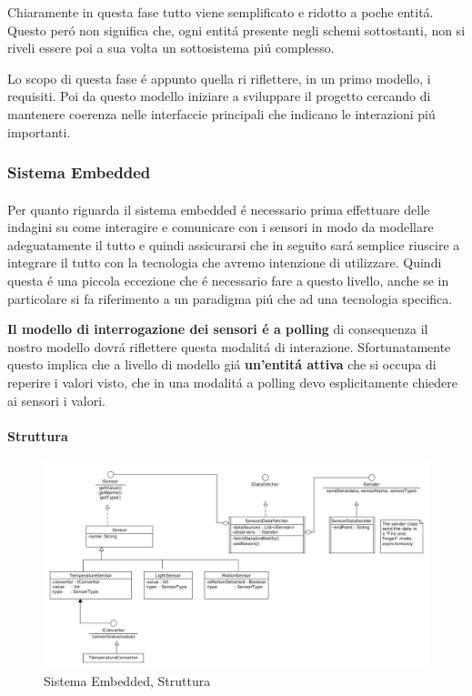Chiaramente in questa fase tutto viene semplificato e ridotto a poche entit\'a. Questo per\'o non significa che, ogni entit\'a presente negli schemi sottostanti, non si riveli essere poi a sua volta un sottosistema pi\'u complesso.

Lo scopo di questa fase \'e appunto quella ri riflettere, in un primo modello, i requisiti. Poi da questo modello iniziare a sviluppare il progetto cercando di mantenere coerenza nelle interfaccie principali che indicano le interazioni pi\'u importanti.

\subsubsection{Sistema Embedded}

\paragraph{}Per quanto riguarda il sistema embedded \'e necessario prima effettuare delle indagini su come interagire e comunicare con i sensori in modo da modellare adeguatamente il tutto e quindi assicurarsi che in seguito sar\'a semplice riuscire a integrare il tutto con la tecnologia che avremo intenzione di utilizzare. Quindi questa \'e una piccola eccezione che \'e necessario fare a questo livello, anche se in particolare si fa riferimento a un paradigma pi\'u che ad una tecnologia specifica.

\textbf{Il modello di interrogazione dei sensori \'e a polling} di consequenza il nostro modello dovr\'a riflettere questa modalit\'a di interazione. Sfortunatamente questo implica che a livello di modello gi\'a \textbf{un'entit\'a attiva} che si occupa di reperire i valori visto, che in una modalit\'a a polling devo esplicitamente chiedere ai sensori i valori.

\paragraph{Struttura}

\begin{figure}[h]
\centering
\includegraphics[width=\textwidth]{Figures/DomainModel/EmbeddedSystem/Structure}
\caption{Sistema Embedded, Struttura}
\end{figure}

